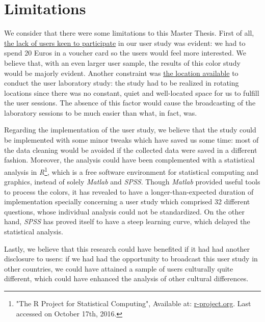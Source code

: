 \section{Limitations}
\label{sec:limitations}
%
We consider that there were some limitations to this Master Thesis. First of all, \ul{the lack of users keen to participate} in our user study was
evident: we had to spend 20 Euros in a voucher card so the users would feel more interested. We believe that, with an even larger user sample, the results
of this color study would be majorly evident.
Another constraint was \ul{the location available} to conduct the user laboratory study: the study had to be realized in rotating locations since there was
no constant, quiet and well-located space for us to fulfill the user sessions. The absence of this factor would cause the broadcasting of the laboratory
sessions to be much easier than what, in fact, was. \par
%
Regarding the implementation of the user study, we believe that the study could be implemented with some minor tweaks which have saved us some time: most
of the data cleaning would be avoided if the collected data were saved in a different fashion. Moreover, the analysis could have been complemented with a statistical analysis in \emph{R}\footnote{"The R Project for Statistical Computing", Available at:
\url{r-project.org}. Last accessed on October 17th, 2016.}, which is a free software environment for statistical computing and graphics, instead of solely
\emph{Matlab} and \emph{SPSS}. Though \emph{Matlab} provided useful tools to process the colors, it has revealed to have a longer-than-expected duration of implementation
specially concerning a user study which comprised 32 different questions, whose individual analysis could not be standardized. On the other hand, \emph{SPSS}
has proved itself to have a steep learning curve, which delayed the statistical analysis. \par
%
Lastly, we believe that this research could have benefited if it had had another disclosure to users: if we had had the opportunity to broadcast this user
study in other countries, we could have attained a sample of users culturally quite different, which could have enhanced the analysis of other cultural
differences.
%
